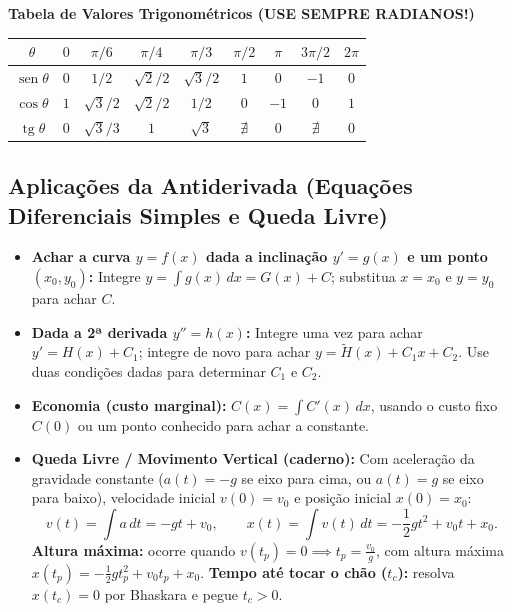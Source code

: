 \documentclass[10pt,a4paper]{article}
\DeclareMathOperator{\sen}{sen}
\DeclareMathOperator{\tg}{tg}
\begin{document}
\begin{center}
\textbf{Tabela de Valores Trigonométricos (USE SEMPRE RADIANOS!)} \\[3pt]
{\small
\begin{tabular}{c|cccccccc}
\toprule
$\theta$ & $0$ & $\pi/6$ & $\pi/4$ & $\pi/3$ & $\pi/2$ & $\pi$ & $3\pi/2$ & $2\pi$ \\
\midrule
$\sen \theta$ & $0$ & $1/2$ & $\sqrt{2}/2$ & $\sqrt{3}/2$ & $1$ & $0$ & $-1$ & $0$ \\
$\cos \theta$ & $1$ & $\sqrt{3}/2$ & $\sqrt{2}/2$ & $1/2$ & $0$ & $-1$ & $0$ & $1$ \\
$\tg \theta$  & $0$ & $\sqrt{3}/3$ & $1$ & $\sqrt{3}$ & $\nexists$ & $0$ & $\nexists$ & $0$ \\
\bottomrule
\end{tabular}
}
\end{center}

\subsection{Aplicações da Antiderivada (Equações Diferenciais Simples e Queda Livre)}
\begin{itemize}
    \item \textbf{Achar a curva $y = f(x)$ dada a inclinação $y' = g(x)$ e um ponto $(x_0, y_0)$:}
          Integre $y = \int g(x)\,dx = G(x) + C$; substitua $x = x_0$ e $y = y_0$ para achar $C$.
    \item \textbf{Dada a 2ª derivada $y'' = h(x)$:}
          Integre uma vez para achar $y' = H(x) + C_1$; integre de novo para achar $y = \tilde{H}(x) + C_1 x + C_2$. Use duas condições dadas para determinar $C_1$ e $C_2$.
    \item \textbf{Economia (custo marginal):} $C(x) = \int C'(x)\,dx$, usando o custo fixo $C(0)$ ou um ponto conhecido para achar a constante.
    \item \textbf{Queda Livre / Movimento Vertical (caderno):}
          Com aceleração da gravidade constante ($a(t) = -g$ se eixo para cima, ou $a(t) = g$ se eixo para baixo), velocidade inicial $v(0) = v_0$ e posição inicial $x(0) = x_0$:
          \[
              v(t) = \int a\,dt = -gt + v_0, \qquad
              x(t) = \int v(t)\,dt = -\frac{1}{2}gt^2 + v_0 t + x_0.
          \]
          \textbf{Altura máxima:} ocorre quando $v(t_p) = 0 \implies \displaystyle t_p = \frac{v_0}{g}$, com altura máxima $x(t_p) = -\frac{1}{2}g t_p^2 + v_0 t_p + x_0$. \quad
          \textbf{Tempo até tocar o chão ($t_c$):} resolva $x(t_c) = 0$ por Bhaskara e pegue $t_c > 0$.
\end{itemize}
\end{document}
